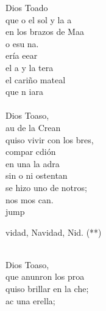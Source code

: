 \begin{cancion}%
	 Dios Toado \\
	que o el sol y la a\\
	en los brazos de Maa \\
	o esu na.\\
	ería eear \\
	el a y la tera\\
	el cariño mateal \\
	que n  iara\\
	\jump\\
	 Dios Toaso,\\
	au de la Crean\\
	quiso vivir con los bres,\\
	compar  cdión\\
	en una la adra \\
	sin o ni ostentan\\
	se hizo uno de notros;\\
	nos mos  can.  \\jump\\
	\begin{chorus}%
	vidad, Navidad, Nid. (**)\\
	\end{chorus}%
	\jump\\
	 Dios Toaso, \\
	que anunron los proa\\
	quiso brillar en la che; \\
	  ac una erella;\\

\end{cancion}

